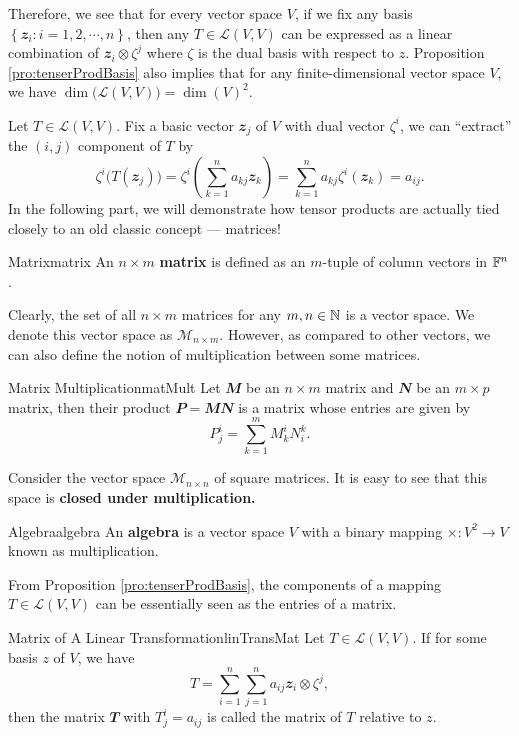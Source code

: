 \documentclass[math]{amznotes}
\theoremstyle{remark}
\begin{document}
Therefore, we see that for every vector space $V$, if we fix any basis $\left\{\mathbfit{z}_i \colon i = 1, 2, \cdots, n\right\}$, then any $T \in \mathcal{L}(V, V)$ can be expressed as a linear combination of $\mathbfit{z}_i \otimes \zeta^j$ where $\zeta$ is the dual basis with respect to $z$. Proposition \ref{pro:tenserProdBasis} also implies that for any finite-dimensional vector space $V$, we have $\dim\bigl(\mathcal{L}(V, V)\bigr) = \dim(V)^2$.

Let $T \in \mathcal{L}(V, V)$. Fix a basic vector $\mathbfit{z}_j$ of $V$ with dual vector $\zeta^i$, we can ``extract'' the $(i, j)$ component of $T$ by
\begin{equation*}
    \zeta^i\bigl(T(\mathbfit{z}_j)\bigr) = \zeta^i\left(\sum_{k = 1}^{n}a_{kj}\mathbfit{z}_k\right) = \sum_{k = 1}^{n}a_{kj}\zeta^i(\mathbfit{z}_k) = a_{ij}.
\end{equation*}
In the following part, we will demonstrate how tensor products are actually tied closely to an old classic concept --- matrices!
\begin{dfnbox}{Matrix}{matrix}
    An $n \times m$ {\color{red} \textbf{matrix}} is defined as an $m$-tuple of column vectors in $\mathbb{F}^n$.
\end{dfnbox}
Clearly, the set of all $n \times m$ matrices for any $m, n \in \mathbb{N}$ is a vector space. We denote this vector space as $\mathcal{M}_{n \times m}$. However, as compared to other vectors, we can also define the notion of multiplication between some matrices.
\begin{dfnbox}{Matrix Multiplication}{matMult}
    Let $\mathbfit{M}$ be an $n \times m$ matrix and $\mathbfit{N}$ be an $m \times p$ matrix, then their product $\mathbfit{P = MN}$ is a matrix whose entries are given by
    \begin{equation*}
        P^i_j = \sum_{k = 1}^{m}M^i_kN^k_i.
    \end{equation*}
\end{dfnbox}
Consider the vector space $\mathcal{M}_{n \times n}$ of square matrices. It is easy to see that this space is \textbf{closed under multiplication.} 
\begin{dfnbox}{Algebra}{algebra}
    An {\color{red} \textbf{algebra}} is a vector space $V$ with a binary mapping $\times \colon V^2 \to V$ known as multiplication.
\end{dfnbox}
From Proposition \ref{pro:tenserProdBasis}, the components of a mapping $T \in \mathcal{L}(V, V)$ can be essentially seen as the entries of a matrix.
\begin{dfnbox}{Matrix of A Linear Transformation}{linTransMat}
    Let $T \in \mathcal{L}(V, V)$. If for some basis $z$ of $V$, we have
    \begin{equation*}
        T = \sum_{i = 1}^{n}\sum_{j = 1}^{n}a_{ij}\mathbfit{z}_i \otimes \zeta^j,
    \end{equation*}
    then the matrix $\mathbfit{T}$ with $T^i_j = a_{ij}$ is called the matrix of $T$ relative to $z$.
\end{dfnbox}
\end{document}
